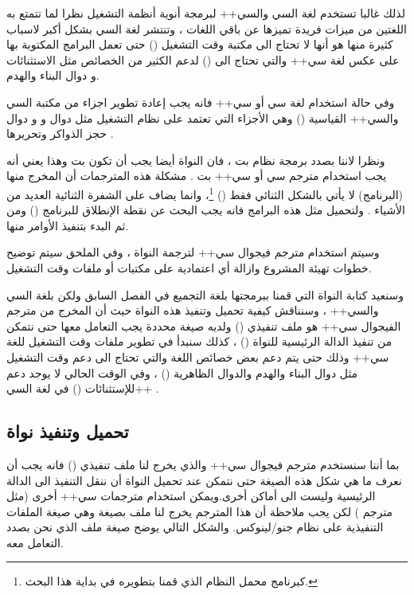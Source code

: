 \documentclass[document.tex]{subfiles}
\begin{document}
لذلك غالبا تستخدم لغة السي والسي++ لبرمجة أنوية أنظمة التشغيل نظرا لما تتمتع به اللغتين من ميزات فريدة تميزها عن باقي اللغات ، وتنتشر لغة السي بشكل أكبر لاسباب كثيرة منها هو أنها لا تحتاج الى مكتبة وقت التشغيل () حتى تعمل البرامج المكتوبة بها على عكس لغة سي++ والتي تحتاج الى () لدعم الكثير من الخصائص مثل الاستثنائات و دوال البناء والهدم.

وفي حالة استخدام لغة سي أو سي++ فانه يجب إعادة تطوير اجزاء من مكتبة السي والسي++ القياسية () وهي الأجزاء التي تعتمد على نظام التشغيل مثل دوال  و  و دوال حجز الذواكر  وتحريرها .

ونظرا لاننا بصدد برمجة نظام  بت ، فان النواة أيضا يجب أن تكون  بت وهذا يعني أنه يجب استخدام مترجم سي أو سي++  بت . مشكلة هذه المترجمات أن المخرج منها (البرنامج) لا يأتي بالشكل الثنائي فقط () \footnote{كبرنامج محمل النظام الذي قمنا بتطويره في بداية هذا البحث.}، وانما يضاف على الشفرة الثنائية العديد من الأشياء . ولتحميل مثل هذه البرامج فانه يجب البحث عن نقطة الإنطلاق للبرنامج () ومن ثم البدء بتنفيذ الأوامر منها.

وسيتم استخدام مترجم فيجوال سي++ لترجمة النواة ، وفي الملحق سيتم توضيح خطوات تهيئة المشروع وازالة أي اعتمادية على مكتبات أو ملفات وقت التشغيل. 

وسنعيد كتابة النواة التي قمنا ببرمجتها بلغة التجميع في الفصل السابق ولكن بلغة السي والسي++ ، وسنناقش كيفية تحميل وتنفيذ هذه النواة حيث أن المخرج من مترجم الفيجوال سي++ هو ملف تنفيذي () ولديه صيغة محددة يجب التعامل معها حتى نتمكن من تنفيذ الدالة الرئيسية للنواة () ، كذلك سنبدأ في تطوير ملفات وقت التشغيل للغة سي++ وذلك حتى يتم دعم بعض خصائص اللغة والتي تحتاج الى دعم وقت التشغيل مثل دوال البناء والهدم والدوال الظاهرية () ، وفي الوقت الحالي لا يوجد دعم للإستثنائات () في لغة السي++ . 

\subsection{تحميل وتنفيذ نواة }
بما أننا سنستخدم مترجم فيجوال سي++ والذي يخرج لنا ملف تنفيذي () فانه يجب أن نعرف ما هي  شكل هذه الصيغة حتى نتمكن عند تحميل النواة أن ننقل التنفيذ الى الدالة الرئيسية وليست الى أماكن أخرى.ويمكن استخدام مترجمات سي++ أخرى (مثل مترجم ) لكن يجب ملاحظة أن هذا المترجم يخرج لنا ملف بصيغة  وهي صيغة الملفات التنفيذية على نظام جنو/لينوكس. والشكل التالي يوضح صيغة ملف  الذي نحن بصدد التعامل معه.
\end{document}
